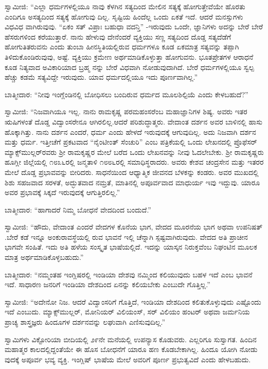 ಸ್ವಾಮೀಜಿ: “ಎಲ್ಲಾ ಧರ್ಮಗಳಲ್ಲಿಯೂ ನಾವು ಕೆಳಗಿನ ಸತ್ಯದಿಂದ ಮೇಲಿನ ಸತ್ಯಕ್ಕೆ ಹೋಗುತ್ತೇವೆಯೇ ಹೊರತು ಎಂದಿಗೂ ಅಸತ್ಯದಿಂದ ಸತ್ಯಕ್ಕೆ ಹೋಗುವು ದಿಲ್ಲ. ಸೃಷ್ಟಿಯ ಹಿಂದೆಲ್ಲ ಒಂದು ಏಕತೆ ಇದೆ. ಆದರೆ ಮನಸ್ಸುಗಳು ವಿಧವಿಧ ವಾಗಿರುವುವು. “ಏಕಂ ಸತ್​ ವಿಪ್ರಾಃ ಬಹುಧಾ ವದನ್ತಿ” -ಇರುವುದು ಒಂದೇ, ಜ್ಞಾನಿಗಳು ಅದನ್ನು ಬೇರೆ ಬೇರೆ ಹೆಸರುಗಳಿಂದ ಕರೆಯುತ್ತಾರೆ. ನಾನು ಹೇಳುವು ದೇನೆಂದರೆ ವ್ಯಕ್ತಿಯು ಸಣ್ಣ ಸತ್ಯದಿಂದ ದೊಡ್ಡ ಸತ್ಯದೆಡೆಗೆ ಹೋಗುತಿತರುವನು ಎಂದು ತುಂಬಾ ಹೀನಸ್ಥಿತಿಯಲ್ಲಿರುವ ಧರ್ಮಗಳೂ ಕೂಡ ಏಕಮಾತ್ರ ಸತ್ಯವನ್ನು ತಪ್ಪಾಗಿ ತಿಳಿದುಕೊಂಡಿರುವುವು, ಅಷ್ಟೆ. ವ್ಯಕ್ತಿಯು ಕ್ರಮೇಣ ಅರ್ಥಮಾಡಿಕೊಳ್ಳುತ್ತಾ ಹೋಗುವನು. ಭೂತಪ್ರೇತಗಳ ಆರಾಧನೆ ಕೂಡ ನಿತ್ಯವಾದ ಅವಿಕಾರಿಯಾದ ಬ್ರಹ್ಮ ನನ್ನು ಬೇರೆ ವಿಧವಾಗಿ ನೋಡುವುದಾಗಿದೆ. ಬೇರೆ ಧರ್ಮಗಳಲ್ಲಿಯೂ ಸ್ವಲ್ಪ ಹೆಚ್ಚು ಕಡಮೆ ಸತ್ಯವಿದ್ದೇ ಇರುವುದು. ಯಾವ ಧರ್ಮದಲ್ಲಿಯೂ ಇದು ಪೂರ್ಣವಾಗಿಲ್ಲ.”

ಬಾತ್ಮೀದಾರ: “ನೀವು ಇಂಗ್ಲೆಂಡಿನಲ್ಲಿ ಬೋಧಿಸಲು ಬಂದಿರುವ ಧರ್ಮದ ಮೂಲಶಿಲ್ಪಿಯೆ ಎಂದು ಕೇಳಬಹುದೆ?”

ಸ್ವಾಮೀಜಿ: “ನಿಜವಾಗಿಯೂ ಇಲ್ಲ. ನಾನು ರಾಮಕೃಷ್ಣ ಪರಮಹಂಸರೆಂಬ ಮಹಾಜ್ಞಾನಿಗಳ ಶಿಷ್ಯ. ಅವರು ಇತರ ಋಷಿಗಳಂತೆ ದೊಡ್ಡ ವಿದ್ವಾಂಸರೇನೂ ಆಗಿರಲಿಲ್ಲ.ಆದರೆ ಪರಿಶುದ್ಧಾತ್ಮರು. ವೇದಾಂತ ದರ್ಶನ ಅವರ ಬಾಳಿನಲ್ಲಿ ಹಾಸು ಹೊಕ್ಕಾಗಿತ್ತು. ನಾನು ದರ್ಶನ ಎಂದರೆ, ಧರ್ಮ ಎಂದು ಹೇಳದೆ ಇರುವುದಕ್ಕೆ ಆಗುವುದಿಲ್ಲ. ಅದು ನಿಜವಾಗಿ ದರ್ಶನ ಮತ್ತು ಧರ್ಮ. ಇತ್ತೀಚೆಗೆ ಪ್ರಕಟವಾದ “ನೈಂಟೀಂತ್​ ಸೆಂಚುರಿ” ಎಂಬ ಪತ್ರಿಕೆಯಲ್ಲಿ ಒಂದು ಲೇಖನದಲ್ಲಿ ಪ್ರೊಫೆಸರ್​ ಮ್ಯಾಕ್ಸ್​ಮುಲ್ಲರ್​ರವರು ಶ‍್ರೀ ರಾಮಕೃಷ್ಣರ ಮೇಲೆ ಬರೆದ ಒಂದು ಲೇಖನವನ್ನು ನೀವು ಓದಲೇಬೇಕು. ಶ‍್ರೀ ರಾಮಕೃಷ್ಣರು ಹೂಗ್ಲೀ ಜಿಲ್ಲೆಯಲ್ಲಿ ೧೮೩೬ರಲ್ಲಿ ಜನ್ಮತಾಳಿ ೧೮೮೬ರಲ್ಲಿ ಸಮಾಧಿಸ್ಥರಾದರು. ಅವರು ಕೇಶವ ಚಂದ್ರಸೇನ ಮತ್ತು ಇತರರ ಮೇಲೆ ದೊಡ್ಡ ಪ್ರಭಾವವನ್ನು ಬೀರಿದರು. ಸಾಧನೆಯಿಂದ ಆಧ್ಯಾತ್ಮಿಕ ಜೀವನದ ಬೆಳಕನ್ನು ಕಂಡರು. ಅವರ ಮುಖದಲ್ಲಿ ಶಿಶು ಸಹಜವಾದ ಸರಳತೆ, ಅದ್ಭುತವಾದ ನಮ್ರತೆ, ಮಾತಿನಲ್ಲಿ ಅಪೂರ್ವವಾದ ಮಾಧುರ್ಯ ಇವು ಇದ್ದುವು. ಯಾರೂ ಅವರ ಪ್ರಭಾವಕ್ಕೆ ಸಿಕ್ಕದೆ ಇರುವುದಕ್ಕೆ ಆಗುತ್ತಿರಲಿಲ್ಲ.”

ಬಾತ್ಮೀದಾರ: “ಹಾಗಾದರೆ ನಿಮ್ಮ ಬೋಧನೆ ವೇದದಿಂದ ಬಂದುದೆ.”

ಸ್ವಾಮೀಜಿ: “ಹೌದು, ವೇದಾಂತ ಎಂದರೆ ವೇದಗಳ ಕೊನೆಯ ಭಾಗ, ವೇದದ ಮೂರನೆಯ ಭಾಗ ಅಥವಾ ಉಪನಿಷತ್​.ಬೇರೆ ಕಡೆ ಇನ್ನೂ ಅಂಕುರಾವಸ್ಥೆಯಲ್ಲಿ ರುವ ಭಾವನೆ ಇಲ್ಲಿ ಚೆನ್ನಾಗಿ ಸ್ಪಷ್ಟವಾಗಿರುವುದು. ವೇದದ ಅತಿ ಪ್ರಾಚೀನ ಭಾಗವೇ ಸಂಹಿತೆ. ಇದು ಅತಿ ಹಳೆಯ ಸಂಸ್ಕೃತ ಭಾಷೆಯಲ್ಲಿದೆ. ಇದನ್ನು ಯಾಸ್ಕನ ನಿರುಕ್ತವೆಂಬ ನಿಘಂಟಿನ ಮೂಲಕ ಮಾತ್ರ ಅರ್ಥಮಾಡಿಕೊಳ್ಳಬಹುದು.”

ಬಾತ್ಮೀದಾರ: “ನಮ್ಮಂತಹ ಇಂಗ್ಲಿಷರಲ್ಲಿ ಇಂಡಿಯಾ ದೇಶವು ನಮ್ಮಿಂದ ಕಲಿಯುವುದು ಬಹಳ ಇದೆ ಎಂಬ ಭಾವನೆ ಇದೆ. ಸಾಧಾರಣ ಜನರಿಗೆ ಇಂಡಿಯಾ ದೇಶದಿಂದ ಏನನ್ನು ಕಲಿಯಬೇಕು ಎಂಬುದೇ ಗೊತ್ತಿಲ್ಲ.”

ಸ್ವಾಮೀಜಿ: “ಅದೇನೋ ನಿಜ. ಆದರೆ ವಿದ್ವಾಂಸರಿಗೆ ಗೊತ್ತಿದೆ, ಇಂಡಿಯಾ ದೇಶದಿಂದ ಕಲಿತುಕೊಳ್ಳುವುದು ಎಷ್ಟೊಂದು ಇದೆ ಎಂಬುದು. ಮ್ಯಾಕ್ಸ್​ಮುಲ್ಲರ್​, ಮೋನಿಯರ್​ ವಿಲಿಯಂಸ್​, ಸರ್​ ವಿಲಿಯಂ ಹಂಟರ್​ ಅಥವಾ ಜರ್ಮನಿಯ ಪ್ರಾಚ್ಯ ಶಾಸ್ತ್ರಜ್ಞರು ಹಿಂದೂಗಳ ದರ್ಶನವನ್ನು ಲಘುವಾಗಿ ಎಣಿಸುವುದಿಲ್ಲ.”

\delimiter

ಸ್ವಾಮಿಗಳು ವಿಕ್ಟೋರಿಯಾ ಬೀದಿಯಲ್ಲಿ ೨೯ನೇ ಮನೆಯಲ್ಲಿ ಉಪನ್ಯಾಸ ಕೊಡುವರು. ಎಲ್ಲರಿಗೂ ಸುಸ್ವಾಗತ. ಹಿಂದಿನ ಮಹಾತ್ಮರ ಕಾಲದಲ್ಲಿದ್ದಂತೆಯೇ ಈ ಹೊಸ ಬೋಧನೆಗೆ ಯಾರೂ ಹಣ ಕೊಡಬೇಕಾಗಿಲ್ಲ. ಹಿಂದೂ ಯೋಗಿ ನೋಡು ವುದಕ್ಕೆ ಅಪೂರ್ವ ಭವ್ಯ ವ್ಯಕ್ತಿ. ಇಂಗ್ಲಿಷ್​ ಭಾಷೆಯ ಮೇಲೆ ಅವರಿಗೆ ಪೂರ್ಣ ಪ್ರಭುತ್ವವಿದೆ ಎಂದು ಹೇಳಬಹುದು.

